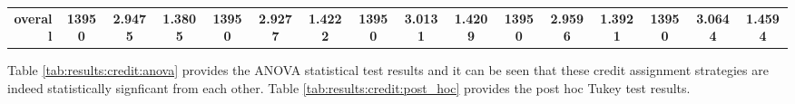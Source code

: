 \begin{table}[htbp]
{\begin{tabular}{rccccccccccccccc}
    \midrule
    \textbf{overall} & \textbf{13950} & \textbf{2.9475} & \textbf{1.3805} & \textbf{13950} & \cellcolor[rgb]{ .776,  .937,  .808}\textcolor[rgb]{ 0,  .38,  0}{\textbf{2.9277}} & \textbf{1.4222} & \textbf{13950} & \textbf{3.0131} & \textbf{1.4209} & \textbf{13950} & \textbf{2.9596} & \textbf{1.3921} & \textbf{13950} & \textbf{3.0644} & \textbf{1.4594} \\
    \end{tabular}%
    }
\end{table}%

Table \ref{tab:results:credit:anova} provides the ANOVA statistical test results and it can be seen that these credit assignment strategies are indeed statistically signficant from each other. Table \ref{tab:results:credit:post_hoc} provides the post hoc Tukey test results. 

\begin{table}[htbp]
	\centering
		\caption{ANOVA - Rank - BHH Variant: Credit}
	\label{tab:results:credit:anova}%
	\par\bigskip
\end{table}


